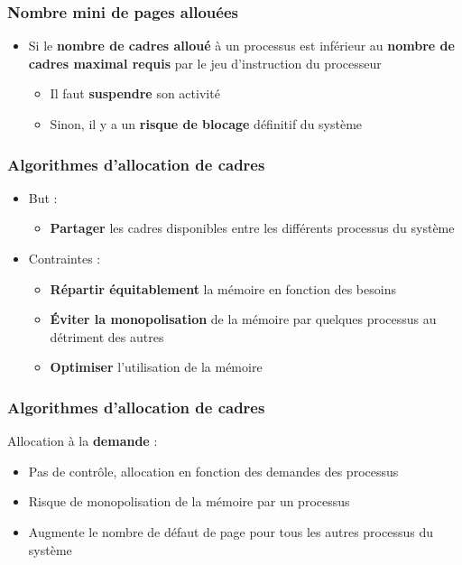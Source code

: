\begin{frame}
\frametitle{Nombre mini de pages allouées}
\begin{itemize}
\item Si le \textbf{nombre de cadres alloué} à un processus est inférieur au \textbf{nombre de cadres maximal requis} par le jeu d'instruction du processeur
\begin{itemize}
\item Il faut \textbf{suspendre} son activité
\item Sinon, il y a un \textbf{risque de blocage} définitif du système
\end{itemize}
\end{itemize}
\end{frame}


\begin{frame}
\frametitle{Algorithmes d'allocation de cadres}
\begin{itemize}
\item But :
\begin{itemize}
\item \textbf{Partager} les cadres disponibles entre les différents processus du système
\end{itemize}
\item Contraintes :
\begin{itemize}
\item \textbf{Répartir équitablement} la mémoire en fonction des besoins
\item \textbf{Éviter la monopolisation} de la mémoire par quelques processus au détriment des autres
\item \textbf{Optimiser} l'utilisation de la mémoire
\end{itemize}
\end{itemize}
\end{frame}


\begin{frame}
\frametitle{Algorithmes d'allocation de cadres}
Allocation à la \textbf{demande} :
\begin{itemize}
\item Pas de contrôle, allocation en fonction des demandes des processus
\item Risque de monopolisation de la mémoire par un processus
\item Augmente le nombre de défaut de page pour tous les autres processus du système
\end{itemize}
\end{frame}


